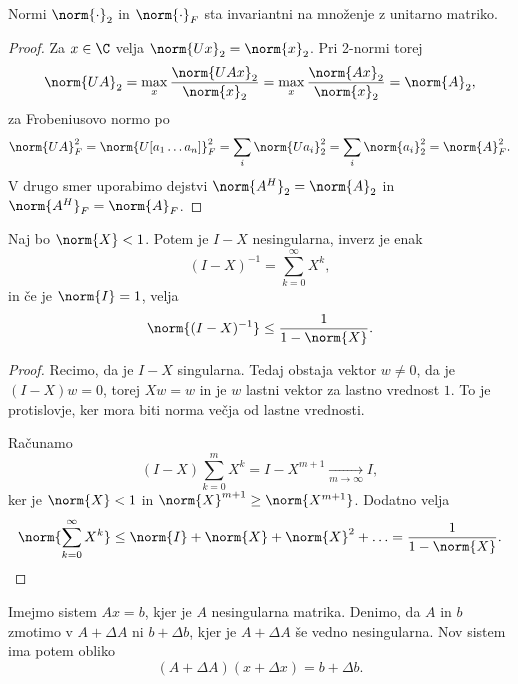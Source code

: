 
\begin{lema}
  Normi $\norm{\cdot}_2$ in $\norm{\cdot}_F$ sta invariantni na množenje z
  unitarno matriko.
\end{lema}

\begin{proof}
  Za $x \in \C$ velja $\norm{Ux}_2 = \norm{x}_2$.
  Pri 2-normi torej
  \[
	\norm{U A}_2
	= \max_x \frac{\norm{UAx}_2}{\norm{x}_2}
	= \max_x \frac{\norm{Ax}_2}{\norm{x}_2}
	= \norm{A}_2,
  \]
  za Frobeniusovo normo po
  \[
	\norm{UA}_F^2
	= \norm{U [a_1 \ldots a_n]}_F^2
	= \sum_i \norm{U a_i}_2^2
	= \sum_i \norm{a_i}_2^2
	= \norm{A}_F^2.
  \]
  V drugo smer uporabimo dejstvi $\norm{A^H}_2 = \norm{A}_2$ in $\norm{A^H}_F =
  \norm{A}_F$.
\end{proof}


\begin{lema}
  Naj bo $\norm{X} < 1$.
  Potem je $I-X$ nesingularna, inverz je enak
  \[
	(I-X)^{-1} = \sum_{k=0}^\infty X^k,
  \]
  in če je $\norm{I} = 1$, velja
  \[
	\norm{(I-X)^{-1}} \le \frac{1}{1 - \norm{X}}.
  \]
\end{lema}

\begin{proof}
  Recimo, da je $I-X$ singularna.
  Tedaj obstaja vektor $w \ne 0$, da je $(I-X)w = 0$, torej $X w = w$ in je $w$
  lastni vektor za lastno vrednost $1$.
  To je protislovje, ker mora biti norma večja od lastne vrednosti.

  Računamo
  \[
	(I-X) \sum_{k=0}^m X^k = I - X^{m+1} \xrightarrow[m \to \infty]{} I,
  \]
  ker je $\norm{X} < 1$ in $\norm{X}^{m+1} \ge \norm{X^{m+1}}$.
  Dodatno velja
  \[
	\norm{ \sum_{k=0}^\infty X^k } \le \norm{I} + \norm{X} + \norm{X}^2 + \ldots
	= \frac{1}{1 - \norm{X}}.
  \]
\end{proof}



Imejmo sistem $Ax = b$, kjer je $A$ nesingularna matrika.
Denimo, da $A$ in $b$ zmotimo v $A + \Delta A$ ni $b + \Delta b$, kjer je $A +
\Delta A$ še vedno nesingularna.
Nov sistem ima potem obliko
\[
  (A + \Delta A) (x + \Delta x) = b + \Delta b.
\]

